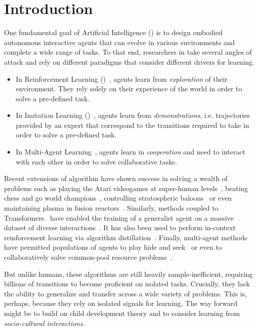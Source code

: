 
\chapter{Introduction}

\minitoc

One fundamental goal of Artificial Intelligence (\ai) is to design embodied autonomous interactive agents that can evolve in various environments and complete a wide range of tasks. To that end, researchers in \ai take several angles of attack and rely on different paradigms that consider different drivers for learning. 
\begin{itemize}[noitemsep]
\item In Reinforcement Learning (\rl)~\citep{sutton2018reinforcement}, agents learn from \textit{exploration} of their environment. They rely solely on their experience of the world in order to solve a pre-defined task. 
\item In Imitation Learning (\il)~\citep{pomerleau1991efficient}, agents learn from \textit{demonstrations}, i.e. trajectories provided by an expert that correspond to the transitions required to take in order to solve a pre-defined task. 
\item In Multi-Agent Learning~\citep{LITTMAN1994157}, agents learn in \textit{cooperation} and need to interact with each other in order to solve collaborative tasks.
\end{itemize}

Recent extensions of \rl algorithm have shown success in solving a wealth of problems such as playing the Atari videogames at super-human levels~\citep{mnih2015human}, beating chess and go world champions~\citep{silver2016mastering}, controlling stratospheric baloons~\citep{bellemare2020autonomous} or even maintaining plasma in fusion reactors~\citep{degrave2022magnetic}. Similarly, \il methods coupled to Transformers~\citep{vaswani2017attention} have enabled the training of a generalist agent on a massive dataset of diverse interactions~\citep{reed2022a}. It has also been used to perform in-context reinforcement learning via algorithm distillation~\citep{laskin2022incontext}. Finally, multi-agent methods have permitted populations of agents to play hide and seek~\citep{Baker2020Emergent} or even to collaboratively solve common-pool resource problems~\citep{perolat2017commonpool}.

But unlike humans, these algorithms are still heavily sample-inefficient, requiring billions of transitions to become proficient on isolated tasks. Crucially, they lack the ability to generalize and transfer across a wide variety of problems. This is, perhaps, because they rely on isolated signals for learning. The way forward might be to build on child development theory and to consider learning from \textit{socio-cultural interactions}.

